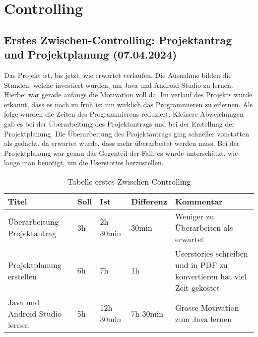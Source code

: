 \setcounter{chapter}{4}
\chapter{Controlling}
\section{Erstes Zwischen-Controlling: Projektantrag und Projektplanung (07.04.2024)}

Das Projekt ist, bis jetzt, wie erwartet verlaufen. Die Ausnahme bilden die Stunden, welche investiert wurden, um Java und Android Studio zu lernen. Hierbei war gerade anfangs die Motivation voll da. Im verlauf des Projekts wurde erkannt, dass es noch zu früh ist um wirklich das Programmieren zu erlernen. Als folge wurden die Zeiten des Programmierens reduziert. Kleinere Abweichungen gab es bei der Überarbeitung des Projektantrags und bei der Erstellung der Projektplanung. Die Überarbeitung des Projektantrags ging schneller vonstatten als gedacht, da erwartet wurde, dass mehr überarbeitet werden muss. Bei der Projektplanung war genau das Gegenteil der Fall, es wurde unterschätzt, wie lange man benötigt, um die Userstories herzustellen. \newline
\begin{table}
\begin{tabularx}{\textwidth}{X|X|X|X|X}
    \textbf{Titel} & \textbf{Soll} & \textbf{Ist} & \textbf{Differenz} & \textbf{Kommentar} \\ \hline
    Überarbeitung Projektantrag & 3h & 2h 30min & 30min & Weniger zu Überarbeiten als erwartet \\ \hline
    Projektplanung erstellen & 6h & 7h & 1h & Userstories schreiben und in PDF zu konvertieren hat viel Zeit gekostet \\ \hline
    Java und Android Studio lernen & 5h & 12h 30min & 7h 30min & Grosse Motivation zum Java lernen
\end{tabularx}
\caption{Tabelle erstes Zwischen-Controlling}
\end{table}
\newpage

